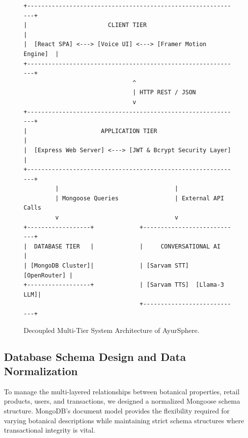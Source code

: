 \documentclass[conference]{IEEEtran}
\begin{document}
\begin{figure}[htbp]
\centering
\begin{lstlisting}[basicstyle=\ttfamily\scriptsize]
+-------------------------------------------------------------+
|                       CLIENT TIER                           |
|  [React SPA] <---> [Voice UI] <---> [Framer Motion Engine]  |
+-------------------------------------------------------------+
                               ^
                               | HTTP REST / JSON
                               v
+-------------------------------------------------------------+
|                     APPLICATION TIER                        |
|  [Express Web Server] <---> [JWT & Bcrypt Security Layer]   |
+-------------------------------------------------------------+
         |                                 |
         | Mongoose Queries                | External API Calls
         v                                 v
+------------------+             +----------------------------+
|  DATABASE TIER   |             |     CONVERSATIONAL AI      |
| [MongoDB Cluster]|             | [Sarvam STT]  [OpenRouter] |
+------------------+             | [Sarvam TTS]  [Llama-3 LLM]|
                                 +----------------------------+
\end{lstlisting}
\caption{Decoupled Multi-Tier System Architecture of AyurSphere.}
\label{fig:arch}
\end{figure}

\subsection{Database Schema Design and Data Normalization}
To manage the multi-layered relationships between botanical properties, retail products, users, and transactions, we designed a normalized Mongoose schema structure. MongoDB's document model provides the flexibility required for varying botanical descriptions while maintaining strict schema structures where transactional integrity is vital.
\end{document}
